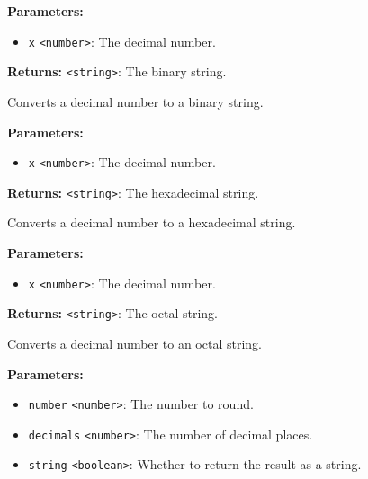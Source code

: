 \documentclass[12pt,a4paper]{article}
\begin{document}
\noindent \textbf{Parameters:}
\begin{itemize}
  \item \texttt{x} \texttt{<number>}: The decimal number.
\end{itemize}

\noindent \textbf{Returns:} \texttt{<string>}: The binary string.

\noindent Converts a decimal number to a binary string.

\vspace{5mm}
\noindent {}


\noindent \textbf{Parameters:}
\begin{itemize}
  \item \texttt{x} \texttt{<number>}: The decimal number.
\end{itemize}

\noindent \textbf{Returns:} \texttt{<string>}: The hexadecimal string.

\noindent Converts a decimal number to a hexadecimal string.

\vspace{5mm}
\noindent {}


\noindent \textbf{Parameters:}
\begin{itemize}
  \item \texttt{x} \texttt{<number>}: The decimal number.
\end{itemize}

\noindent \textbf{Returns:} \texttt{<string>}: The octal string.

\noindent Converts a decimal number to an octal string.

\vspace{5mm}
\noindent {}


\noindent \textbf{Parameters:}
\begin{itemize}
  \item \texttt{number} \texttt{<number>}: The number to round.
  \item \texttt{decimals} \texttt{<number>}: The number of decimal places.
  \item \texttt{string} \texttt{<boolean>}: Whether to return the result as a string.
\end{itemize}
\end{document}
